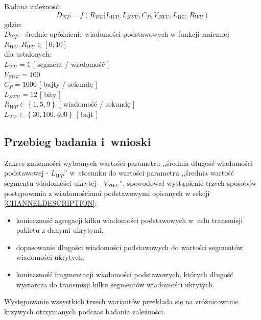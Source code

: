 \documentclass[a4paper, twoside, openright, 12pt]{report}
\begin{document}
            Badana zależność: \\
                $$ D_{WP} = f(R_{WU} | L_{WP}, L_{SWU}, C_P, V_{SWU}, L_{WU}, R_{WU}) $$
            gdzie:\\
                    \( D_{WP} \) - średnie opóźnienie wiadomości podstawowych w funkcji zmiennej \( R_{WU}, R_{WU} \in [0;10] \) \\
           dla ustalonych: \\
                    \( L_{WU} = 1 \) [ segment / wiadomość ]\\
                    \( V_{SWU} = 100 \)\\
                    \( C_P = 1000 \) [ bajty / sekundę ]\\
                    \( L_{SWU} = 12 \) [ bity ]\\
                    \( R_{WP} \in \left\{ 1, 5, 9 \right\}\) [ wiadomość / sekundę ]\\
                    \( L_{WP} \in \left\{ 30, 100, 400 \right\}\) [ bajt ]\\
        \subsection{Przebieg badania i~wnioski}
            Zakres zmienności wybranych wartości parametru ,,średnia długość
            wiadomości podstawowej - \(  L_{WP} \)'' w~stosunku do wartości parametru
            ,,średnia wartość segmentu wiadomości ukrytej - \( V_{SWU} \)'',
            spowodował wystąpienie trzech sposobów postępowania z wiadomościami podstawowymi
            opisanych w sekcji \ref{CHANNELDESCRIPTION}:
        \begin{itemize}
            \item konieczność agregacji kilku wiadomości podstawowych w~celu transmisji pakietu z danymi ukrytymi,
            \item dopasowanie długości wiadomości podstawowych do wartości segmentów wiadomości ukrytych,
            \item konieczność fragmentacji wiadomości podstawowych, których długość wystarcza do transmisji kilku segmentów wiadomości ukrytych.
        \end{itemize}
            Występowanie wszystkich trzech wariantów przekłada
            się na zróżnicowanie krzywych otrzymanych podczas badania zależności.
\end{document}
